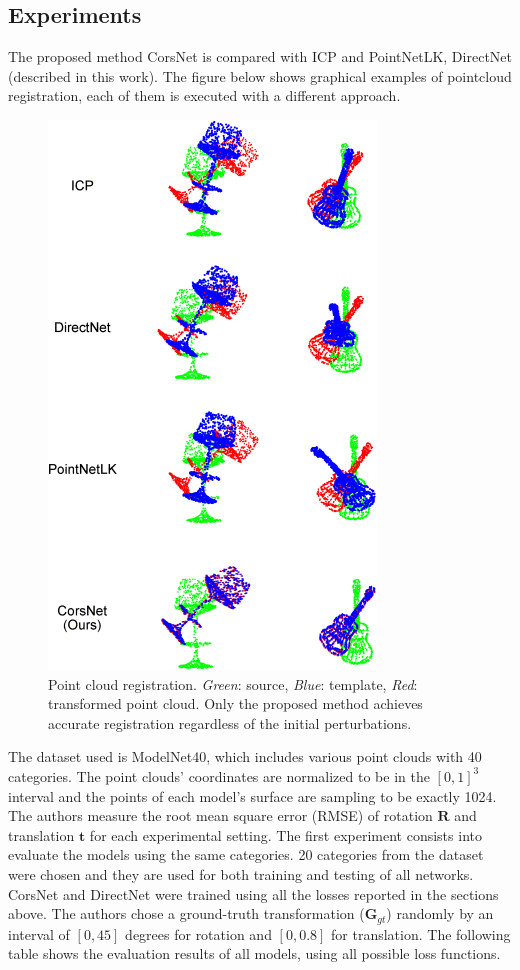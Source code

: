 \subsection{Experiments}\label{header-n581}

The proposed method CorsNet is compared with ICP and PointNetLK,
DirectNet (described in this work). The figure below shows graphical examples of pointcloud registration, each of them is executed with a different approach.

\begin{figure}[h!]
\centering
\includegraphics[width=0.4\linewidth]{images/pointcloudreg.png}
\caption{Point cloud registration. \emph{Green}: source, \emph{Blue}: template, \emph{Red}: transformed point cloud. Only the proposed method achieves accurate registration regardless of the initial perturbations.}
\end{figure}

The dataset used is ModelNet40, which includes various point clouds with
40 categories. The point clouds' coordinates are normalized to be in the
$[0, 1]^3$ interval and the points of each model's surface are
sampling to be exactly 1024. The authors measure the root mean square
error (RMSE) of rotation $\boldsymbol{R}$ and translation
$\boldsymbol{t}$ for each experimental setting. The first experiment
consists into evaluate the models using the same categories. 20
categories from the dataset were chosen and they are used for both
training and testing of all networks. CorsNet and DirectNet were trained
using all the losses reported in the sections above. The authors chose a
ground-truth transformation ($\boldsymbol{G}_{gt}$) randomly by an
interval of $[0, 45]$ degrees for rotation and $[0, 0.8]$ for
translation. The following table shows the evaluation results of all
models, using all possible loss functions.

